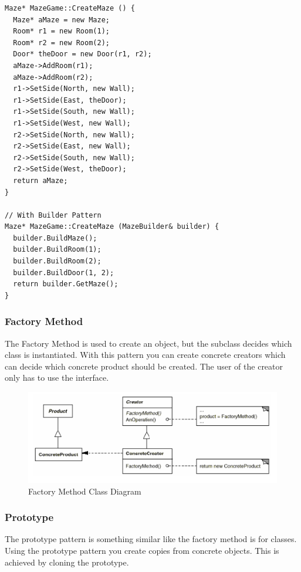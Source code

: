 \documentclass[11pt]{article}
\begin{document}
\begin{lstlisting}
Maze* MazeGame::CreateMaze () {
  Maze* aMaze = new Maze;
  Room* r1 = new Room(1);
  Room* r2 = new Room(2);
  Door* theDoor = new Door(r1, r2);
  aMaze->AddRoom(r1);
  aMaze->AddRoom(r2);
  r1->SetSide(North, new Wall);
  r1->SetSide(East, theDoor);
  r1->SetSide(South, new Wall);
  r1->SetSide(West, new Wall);
  r2->SetSide(North, new Wall);
  r2->SetSide(East, new Wall);
  r2->SetSide(South, new Wall);
  r2->SetSide(West, theDoor);
  return aMaze;
}

// With Builder Pattern
Maze* MazeGame::CreateMaze (MazeBuilder& builder) {
  builder.BuildMaze();
  builder.BuildRoom(1);
  builder.BuildRoom(2);
  builder.BuildDoor(1, 2);
  return builder.GetMaze();
}
\end{lstlisting}
\subsubsection{Factory Method}
\label{sec:org5016149}
The Factory Method is used to create an object, but the subclass decides which class is instantiated.
With this pattern you can create concrete creators which can decide which concrete product should be created.
The user of the creator only has to use the interface.


\begin{figure}[htbp]
\centering
\includegraphics[width=.9\linewidth]{img/factory_method.png}
\caption{\label{fig:factory-method-class-diagram}Factory Method Class Diagram}
\end{figure}

\subsubsection{Prototype}
\label{sec:orgbc94cb9}
The prototype pattern is something similar like the factory method is for classes.
Using the prototype pattern you create copies from concrete objects.
This is achieved by cloning the prototype.
\end{document}
